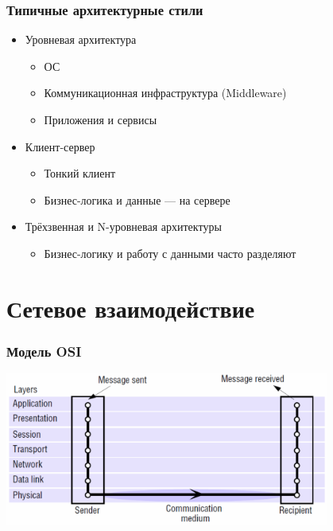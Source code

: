 \documentclass[xetex,mathserif,serif]{beamer}
\begin{document}
	\begin{frame}
		\frametitle{Типичные архитектурные стили}
		\begin{itemize}
			\item Уровневая архитектура
			\begin{itemize}
				\item ОС
				\item Коммуникационная инфраструктура (Middleware)
				\item Приложения и сервисы
			\end{itemize}
			\item Клиент-сервер
			\begin{itemize}
				\item Тонкий клиент
				\item Бизнес-логика и данные --- на сервере
			\end{itemize}
			\item Трёхзвенная и N-уровневая архитектуры
			\begin{itemize}
				\item Бизнес-логику и работу с данными часто разделяют
			\end{itemize}
		\end{itemize}
	\end{frame}

	\section{Сетевое взаимодействие}

	\begin{frame}
		\frametitle{Модель OSI}
		\begin{center}
			\includegraphics[width=0.8\textwidth]{osiStack.png}
		\end{center}
	\end{frame}
\end{document}
